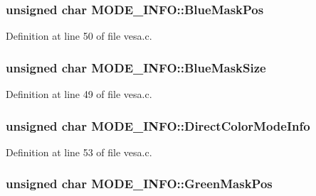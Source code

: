 \subsubsection[{\texorpdfstring{Blue\+Mask\+Pos}{BlueMaskPos}}]{\setlength{\rightskip}{0pt plus 5cm}unsigned char M\+O\+D\+E\+\_\+\+I\+N\+F\+O\+::\+Blue\+Mask\+Pos}\hypertarget{structMODE__INFO_ae2adf5427d1c133490ef54268d409bde}{}\label{structMODE__INFO_ae2adf5427d1c133490ef54268d409bde}


Definition at line 50 of file vesa.\+c.

\subsubsection[{\texorpdfstring{Blue\+Mask\+Size}{BlueMaskSize}}]{\setlength{\rightskip}{0pt plus 5cm}unsigned char M\+O\+D\+E\+\_\+\+I\+N\+F\+O\+::\+Blue\+Mask\+Size}\hypertarget{structMODE__INFO_a3f3aae9079285d788424ddf9c0ab4da9}{}\label{structMODE__INFO_a3f3aae9079285d788424ddf9c0ab4da9}


Definition at line 49 of file vesa.\+c.

\subsubsection[{\texorpdfstring{Direct\+Color\+Mode\+Info}{DirectColorModeInfo}}]{\setlength{\rightskip}{0pt plus 5cm}unsigned char M\+O\+D\+E\+\_\+\+I\+N\+F\+O\+::\+Direct\+Color\+Mode\+Info}\hypertarget{structMODE__INFO_a2ed2e0b7027fd0394545e4967e59d9bf}{}\label{structMODE__INFO_a2ed2e0b7027fd0394545e4967e59d9bf}


Definition at line 53 of file vesa.\+c.

\subsubsection[{\texorpdfstring{Green\+Mask\+Pos}{GreenMaskPos}}]{\setlength{\rightskip}{0pt plus 5cm}unsigned char M\+O\+D\+E\+\_\+\+I\+N\+F\+O\+::\+Green\+Mask\+Pos}\hypertarget{structMODE__INFO_a812caaff15468cef3ea4207ceb2c16c4}{}\label{structMODE__INFO_a812caaff15468cef3ea4207ceb2c16c4}


